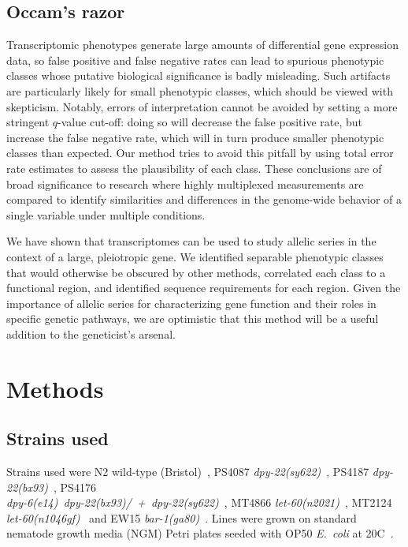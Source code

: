 \documentclass[8pt, twocolumn]{article}
\newcommand{\ecol}{\emph{E.~coli}}
\newcommand{\gene}[1]{\mbox{\emph{#1}}}
\newcommand{\dpy}[1]{\gene{dpy-22#1}}
\newcommand{\bx}{\dpy{(bx93)}}
\newcommand{\sy}{\dpy{(sy622)}}
\begin{document}
\subsection*{Occam's razor}
Transcriptomic phenotypes generate large amounts of differential gene expression
data, so false positive and false negative rates can lead to spurious phenotypic
classes whose putative biological significance is badly misleading. Such
artifacts are particularly likely for small phenotypic classes, which should be
viewed with skepticism. Notably, errors of interpretation cannot be avoided by
setting a more stringent $q$-value cut-off: doing so will decrease the false
positive rate, but increase the false negative rate, which will in turn produce
smaller phenotypic classes than expected. Our method tries to avoid this pitfall
by using total error rate estimates to assess the plausibility of each class.
These conclusions are of broad significance to research where highly multiplexed
measurements are compared to identify similarities and differences in the
genome-wide behavior of a single variable under multiple conditions.

We have shown that transcriptomes can be used to study allelic series in the
context of a large, pleiotropic gene. We identified separable phenotypic classes
that would otherwise be obscured by other methods, correlated each class to a
functional region, and identified sequence requirements for each region. Given
the importance of allelic series for characterizing gene function and their
roles in specific genetic pathways, we are optimistic that this method will be a
useful addition to the geneticist's arsenal.

\section*{Methods}
\label{sec:methods}

\subsection*{Strains used}
Strains used were N2 wild-type (Bristol)~\cite{Brenner1974},
PS4087 \sy{}~\cite{Moghal2003},
PS4187 \bx{}~\cite{Zhang2000},
PS4176\\ \gene{dpy-6(e14) dpy-22(bx93)/ + dpy-22(sy622)}~\cite{Moghal2003},
MT4866 \gene{let-60(n2021)}~\cite{Beitel1990a},
MT2124 \gene{let-60(n1046gf)}~\cite{Beitel1990a} and
EW15 \gene{bar-1(ga80)}~\cite{Eisenmann1998}.
Lines were grown on standard nematode growth media (NGM) Petri plates seeded
with OP50 \ecol{} at 20\degree{}C~\cite{Brenner1974}.
\end{document}
